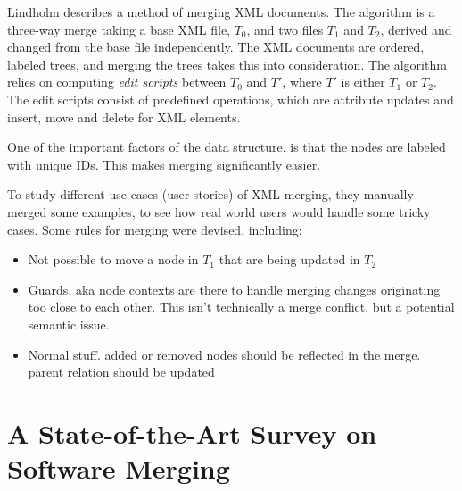 \documentclass[a4paper,english]{ifimaster}
\begin{document}
Lindholm describes a method of merging XML documents. The algorithm is a three-way merge taking a base XML file, $T_0$, and two files $T_1$ and $T_2$, derived and changed from the base file independently. The XML documents are ordered, labeled trees, and merging the trees takes this into consideration. The algorithm relies on computing \textit{edit scripts} between $T_0$ and $T'$, where $T'$ is either $T_1$ or $T_2$. The edit scripts consist of predefined operations, which are attribute updates and insert, move and delete for XML elements.

One of the important factors of the data structure, is that the nodes are labeled with unique IDs. This makes merging significantly easier.

To study different use-cases (user stories) of XML merging, they manually merged some examples, to see how real world users would handle some tricky cases. Some rules for merging were devised, including:

\begin{itemize}
	\item Not possible to move a node in $T_1$ that are being updated in $T_2$
	\item Guards, aka node contexts are there to handle merging changes originating too close to each other. This isn't technically a merge conflict, but a potential semantic issue.
	\item Normal stuff. added or removed nodes should be reflected in the merge. parent relation should be updated
\end{itemize}


\section{A State-of-the-Art Survey on Software Merging}
\label{sec:a_state_of_the_art_survey_on_software_merging}



\backmatter{}

\printbibliography{}
\end{document}
